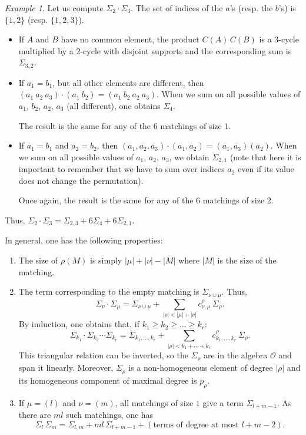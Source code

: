 \documentclass[10pt]{amsart}
\theoremstyle{remark}
\newtheorem{example}{Example}
\newcommand{\obs}{\mathscr{O}}
\begin{document}
\begin{example}
Let us compute $\varSigma_{2} \cdot \varSigma_{3}$. The set of indices of the $a$'s (resp. the $b$'s) is $\{1,2\}$ (resp. $\{1,2,3\}$).
\begin{itemize}
 \item If $A$ and $B$ have no common element, the product $C(A) \, C(B)$ is a 3-cycle multiplied by a 2-cycle with disjoint supports and the corresponding sum is $\varSigma_{3,2}$.
 \item If $a_1=b_1$, but all other elements are different, then $(a_1\ a_2\ a_3)\cdot (a_1\ b_2) = (a_1\ b_2\ a_2\ a_3)$. When we sum on all possible values of $a_1$, $b_2$, $a_2$, $a_3$ (all different), one obtains $\varSigma_4$.

The result is the same for any of the $6$ matchings of size $1$.
 \item If $a_1=b_1$ and $a_2=b_2$, then $(a_1,a_2,a_3)\cdot (a_1,a_2) = (a_1,a_3)(a_2)$. When we sum on all possible values of $a_1$, $a_2$, $a_3$, we obtain $\varSigma_{2,1}$ (note that here it is important to remember that we have to sum over indices $a_2$ even if its value does not change the permutation).

Once again, the result is the same for any of the $6$ matchings of size $2$.
\end{itemize}

Thus, $\varSigma_{2} \cdot \varSigma_{3} = \varSigma_{2,3} + 6 \varSigma_4 + 6 \varSigma_{2,1}$.
\end{example}\medskip

\noindent In general, one has the following properties:
\begin{enumerate}
 \item The size of $\rho(M)$ is simply $|\mu|+|\nu|-|M|$ where $|M|$ is the size of the matching.
 \item The term corresponding to the empty matching is $\varSigma_{\nu \cup \mu}$. Thus, $$\varSigma_\nu \cdot \varSigma_\mu = \varSigma_{\nu \cup \mu} + \sum_{|\rho| < |\mu|+ |\nu|} c^\rho_{\nu,\mu} \,\varSigma_\rho.$$ By induction, one obtains that, if $k_1 \geq k_2 \geq \ldots \geq k_r$:
$$\varSigma_{k_1} \cdot \varSigma_{k_2}\cdots \varSigma_{k_r} = \varSigma_{k_1,\ldots,k_r} + \sum_{|\rho| < k_1 + \cdots + k_r} c^\rho_{k_1,\ldots,k_r}\, \varSigma_\rho.$$
This triangular relation can be inverted, so the $\varSigma_\rho$ are in the algebra $\obs$ and span it linearly. Moreover, $\varSigma_\rho$ is a non-homogeneous element of degree $|\rho|$ and its homogeneous component of maximal degree is $p_\rho$.
 \item If $\mu=(l)$ and $\nu=(m)$, all matchings of size $1$ give a term $\varSigma_{l+m-1}$. As there are $ml$ such matchings, one has $$\varSigma_l \,\varSigma_m = \varSigma_{l,m} +ml\, \varSigma_{l+m-1}+(\text{terms of degree at most }l+m-2).$$
\end{enumerate}\bigskip
\end{document}
